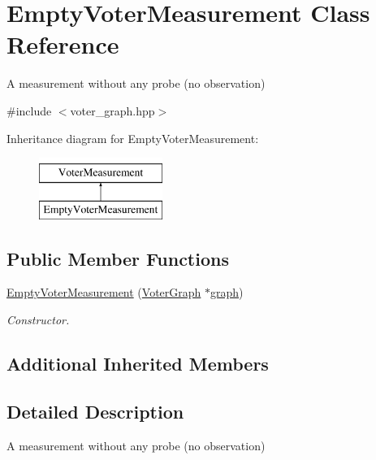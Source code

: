 \hypertarget{class_empty_voter_measurement}{\section{Empty\-Voter\-Measurement Class Reference}
\label{class_empty_voter_measurement}
}


A measurement without any probe (no observation)  




{\ttfamily \#include $<$voter\-\_\-graph.\-hpp$>$}

Inheritance diagram for Empty\-Voter\-Measurement\-:\begin{figure}[H]
\begin{center}
\leavevmode
\includegraphics[height=2.000000cm]{class_empty_voter_measurement}
\end{center}
\end{figure}
\subsection*{Public Member Functions}
\begin{DoxyCompactItemize}
\item 
\hyperlink{class_empty_voter_measurement_aff7c264f9f2e68e3608e30b359468ed0}{Empty\-Voter\-Measurement} (\hyperlink{class_voter_graph}{Voter\-Graph} $\ast$\hyperlink{class_voter_measurement_a8d22d4b78f7e2f4c747f5716c4885351}{graph})
\begin{DoxyCompactList}\small\item\em Constructor. \end{DoxyCompactList}\end{DoxyCompactItemize}
\subsection*{Additional Inherited Members}


\subsection{Detailed Description}
A measurement without any probe (no observation) 

